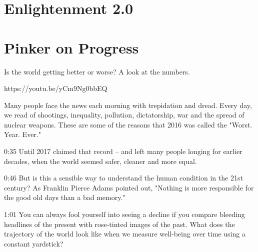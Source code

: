 \documentclass[10pt,titlepage]{article}
\begin{document}
\section{Enlightenment 2.0}

\appendix

\section{Pinker on Progress}

Is the world getting better or worse? A look at the numbers.

https://youtu.be/yCm9Ng0bbEQ


Many people face the news each morning
with trepidation and dread.
Every day, we read of shootings,
inequality, pollution, dictatorship,
war and the spread of nuclear weapons.
These are some of the reasons
that 2016 was called the "Worst. Year. Ever."

0:35
Until 2017 claimed that record --
and left many people longing for earlier decades,
when the world seemed safer, cleaner and more equal.

0:46
But is this a sensible way to understand the human condition
in the 21st century?
As Franklin Pierce Adams pointed out,
"Nothing is more responsible for the good old days
than a bad memory."

1:01
You can always fool yourself into seeing a decline
if you compare bleeding headlines of the present
with rose-tinted images of the past.
What does the trajectory of the world look like
when we measure well-being over time using a constant yardstick?

\paragraph{}
\end{document}
